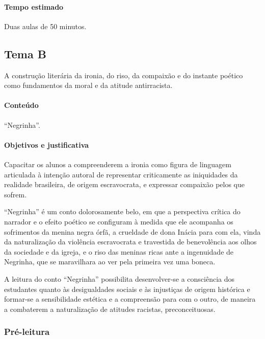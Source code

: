 \documentclass[11pt]{extarticle}
\begin{document}
\paragraph{Tempo estimado} Duas aulas de 50 minutos.

\subsection{Tema B}

A construção literária da ironia, do riso, da compaixão e do instante
poético como fundamentos da moral e da atitude antirracista.

\paragraph{Conteúdo} ``Negrinha''.

\paragraph{Objetivos e justificativa}
Capacitar os alunos a compreenderem a ironia como figura de linguagem
articulada à intenção autoral de representar criticamente as iniquidades
da realidade brasileira, de origem escravocrata, e expressar compaixão
pelos que sofrem.

``Negrinha'' é um conto dolorosamente belo, em que a perspectiva crítica
do narrador e o efeito poético se configuram à medida que ele acompanha
os sofrimentos da menina negra órfã, a crueldade de dona Inácia para com
ela, vinda da naturalização da violência escravocrata e travestida de
benevolência aos olhos da sociedade e da igreja, e o riso das meninas
ricas ante a ingenuidade de Negrinha, que se maravilhara ao ver pela
primeira vez uma boneca.

A leitura do conto ``Negrinha'' possibilita desenvolver-se a consciência
dos estudantes quanto às desigualdades sociais e às injustiças de origem
histórica e formar-se a sensibilidade estética e a compreensão para com
o outro, de maneira a combaterem a naturalização de atitudes racistas,
preconceituosas.


\subsubsection{Pré-leitura}
\end{document}
